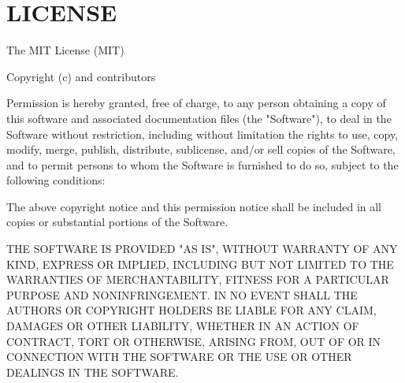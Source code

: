 \chapter{LICENSE }
\hypertarget{md__c_1_2xampp_2htdocs_2_g_pagos_ayuntamiento_2vendor_2pestphp_2pest-plugin-mutate_2_l_i_c_e_n_s_e}{}\label{md__c_1_2xampp_2htdocs_2_g_pagos_ayuntamiento_2vendor_2pestphp_2pest-plugin-mutate_2_l_i_c_e_n_s_e}
The MIT License (MIT)

Copyright (c)  and contributors

Permission is hereby granted, free of charge, to any person obtaining a copy of this software and associated documentation files (the "{}\+Software"{}), to deal in the Software without restriction, including without limitation the rights to use, copy, modify, merge, publish, distribute, sublicense, and/or sell copies of the Software, and to permit persons to whom the Software is furnished to do so, subject to the following conditions\+:

The above copyright notice and this permission notice shall be included in all copies or substantial portions of the Software.

THE SOFTWARE IS PROVIDED "{}\+AS IS"{}, WITHOUT WARRANTY OF ANY KIND, EXPRESS OR IMPLIED, INCLUDING BUT NOT LIMITED TO THE WARRANTIES OF MERCHANTABILITY, FITNESS FOR A PARTICULAR PURPOSE AND NONINFRINGEMENT. IN NO EVENT SHALL THE AUTHORS OR COPYRIGHT HOLDERS BE LIABLE FOR ANY CLAIM, DAMAGES OR OTHER LIABILITY, WHETHER IN AN ACTION OF CONTRACT, TORT OR OTHERWISE, ARISING FROM, OUT OF OR IN CONNECTION WITH THE SOFTWARE OR THE USE OR OTHER DEALINGS IN THE SOFTWARE. 